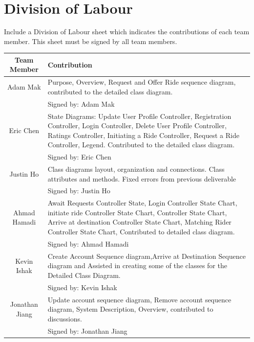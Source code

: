 \documentclass[]{article}
\begin{document}

\appendix
\section{Division of Labour}
\label{sec:division_of_labour}
Include a Division of Labour sheet which indicates the contributions of each team member. This sheet must be signed by all team members.
\begin{center} \begin{tabular} {|c|p{35em}|}
	\hline
	\textbf{Team Member} & \textbf{Contribution} \\
	\hline \hline
	Adam Mak & Purpose, Overview, Request and Offer Ride sequence diagram, contributed to the detailed class diagram.\\
	& Signed by: Adam Mak\\
	\hline
	Eric Chen & State Diagrams: Update User Profile Controller, Registration Controller, Login Controller, Delete User Profile Controller, Ratings Controller, Initiating a Ride Controller, Request a Ride Controller, Legend. Contributed to the detailed class diagram.\\
	& Signed by: Eric Chen\\
	\hline
	Justin Ho & Class diagrams layout, organization and connections. Class attributes and methods. Fixed errors from previous deliverable \\
	& Signed by: Justin Ho\\
	\hline
	Ahmad Hamadi &Await Requests Controller State, Login Controller State Chart, initiate ride Controller State Chart, Controller State Chart, Arrive at destination Controller State Chart, Matching Rider Controller State Chart, Contributed to detailed class diagram. \\
	& Signed by: Ahmad Hamadi  \\
	\hline
	Kevin Ishak & Create Account Sequence diagram,Arrive at Destination Sequence diagram and Assisted in creating some of the classes for the Detailed Class Diagram. \\
	& Signed by: Kevin Ishak \\ 
	\hline
	Jonathan Jiang & Update account sequence diagram, Remove account sequence diagram, System Description, Overview, contributed to discussions. \\
	& Signed by: Jonathan Jiang \\
	\hline
\end{tabular} \end{center}
\end{document}
